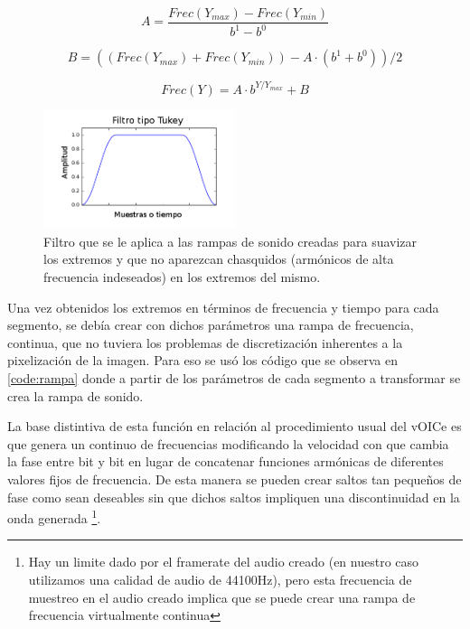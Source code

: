 \documentclass{article}
\begin{document}
    \begin{equation}
        \label{ec:yToF1}
        A = \frac{Frec(Y_{max}) - Frec(Y_{min}) }{b^1-b^0}
    \end{equation}
    
    \begin{equation}
        \label{ec:yToF2}
        B = ((Frec(Y_{max}) + Frec(Y_{min})) - A \cdot (b^1 + b^0)) / 2
    \end{equation}
    
    \begin{equation}
        \label{ec:yToF3}
        Frec(Y) = A \cdot b^{Y/Y_{max}} + B
    \end{equation}
    
    \begin{figure}
        \center
        \includegraphics[width=0.5\textwidth]{Imagenes/tukey.png}
        \caption{Filtro que se le aplica a las rampas de sonido creadas para suavizar los extremos y que no aparezcan chasquidos (armónicos de alta frecuencia indeseados) en los extremos del mismo.}
        \label{fig:tukey}
    \end{figure}
    
    Una vez obtenidos los extremos en términos de frecuencia y tiempo para cada segmento, se debía crear con dichos parámetros una rampa de frecuencia, continua, que no tuviera los problemas de discretización inherentes a la pixelización de la imagen. Para eso se usó los código que se observa en \ref{code:rampa} donde a partir de los parámetros de cada segmento a transformar se crea la rampa de sonido.
    
    La base distintiva de esta función en relación al procedimiento usual del vOICe es que genera un continuo de frecuencias modificando la velocidad con que cambia la fase entre bit y bit en lugar de concatenar funciones armónicas de diferentes valores fijos de frecuencia. De esta manera se pueden crear saltos tan pequeños de fase como sean deseables sin que dichos saltos impliquen una discontinuidad en la onda generada \footnote{Hay un limite dado por el framerate del audio creado (en nuestro caso utilizamos una calidad de audio de 44100Hz), pero esta frecuencia de muestreo en el audio creado implica que se puede crear una rampa de frecuencia virtualmente continua}. 
    
\end{document}
